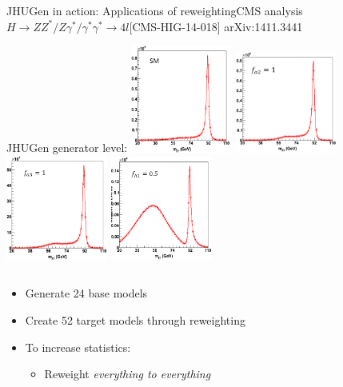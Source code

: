 \documentclass[usenames,dvipsnames,svgnames,table]{beamer}
\begin{document}
\begin{frame}{JHUGen in action: Applications of reweighting}{CMS analysis $H \to ZZ^*/Z\gamma^*/\gamma^*\gamma^* \to 4l$\hfill [CMS-HIG-14-018] arXiv:1411.3441}

JHUGen generator level:
\includegraphics[width=0.25\textwidth]{reweighting/HVV/SM}
\includegraphics[width=0.25\textwidth]{reweighting/HVV/fa2}
\includegraphics[width=0.25\textwidth]{reweighting/HVV/fa3}
\includegraphics[width=0.25\textwidth]{reweighting/HVV/flambda1}
\begin{columns}
\begin{column}{0.6\textwidth}
\footnotesize
\begin{itemize}
\item Generate 24 base models
\item Create 52 target models through reweighting
\item To increase statistics:
\begin{itemize}
\item Reweight \emph{everything to everything}
\end{itemize}

\end{itemize}
\end{column}
\end{columns}
\end{frame}
\end{document}
